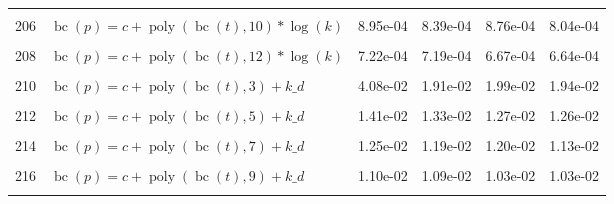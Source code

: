 \documentclass[12pt,a4paper]{article}
\DeclareMathOperator{\bc}{bc}
\DeclareMathOperator{\poly}{poly}
\begin{document}
\begin{longtable}[t]{ll>{\raggedleft\arraybackslash}p{2cm}>{\raggedleft\arraybackslash}p{2cm}>{\raggedleft\arraybackslash}p{2cm}>{\raggedleft\arraybackslash}p{2cm}}
\cellcolor{gray!6}{205} & \cellcolor{gray!6}{$\bc(p) = c + \poly\left( \bc(t), 9 \right) * \log(k)$} & \cellcolor{gray!6}{1.11e-03} & \cellcolor{gray!6}{1.05e-03} & \cellcolor{gray!6}{1.11e-03} & \cellcolor{gray!6}{1.04e-03}\\
206 & $\bc(p) = c + \poly\left( \bc(t), 10 \right) * \log(k)$ & 8.95e-04 & 8.39e-04 & 8.76e-04 & 8.04e-04\\
\cellcolor{gray!6}{207} & \cellcolor{gray!6}{$\bc(p) = c + \poly\left( \bc(t), 11 \right) * \log(k)$} & \cellcolor{gray!6}{7.74e-04} & \cellcolor{gray!6}{7.62e-04} & \cellcolor{gray!6}{7.18e-04} & \cellcolor{gray!6}{7.01e-04}\\
208 & $\bc(p) = c + \poly\left( \bc(t), 12 \right) * \log(k)$ & 7.22e-04 & 7.19e-04 & 6.67e-04 & 6.64e-04\\
\cellcolor{gray!6}{209} & \cellcolor{gray!6}{$\bc(p) = c + \poly\left( \bc(t), 13 \right) * \log(k)$} & \cellcolor{gray!6}{7.12e-04} & \cellcolor{gray!6}{7.11e-04} & \cellcolor{gray!6}{6.54e-04} & \cellcolor{gray!6}{6.53e-04}\\
210 & $\bc(p) = c + \poly\left( \bc(t), 3 \right) + k\_d$ & 4.08e-02 & 1.91e-02 & 1.99e-02 & 1.94e-02\\
\cellcolor{gray!6}{211} & \cellcolor{gray!6}{$\bc(p) = c + \poly\left( \bc(t), 4 \right) + k\_d$} & \cellcolor{gray!6}{2.39e-02} & \cellcolor{gray!6}{2.21e-02} & \cellcolor{gray!6}{2.36e-02} & \cellcolor{gray!6}{2.31e-02}\\
212 & $\bc(p) = c + \poly\left( \bc(t), 5 \right) + k\_d$ & 1.41e-02 & 1.33e-02 & 1.27e-02 & 1.26e-02\\
\cellcolor{gray!6}{213} & \cellcolor{gray!6}{$\bc(p) = c + \poly\left( \bc(t), 6 \right) + k\_d$} & \cellcolor{gray!6}{1.24e-02} & \cellcolor{gray!6}{1.19e-02} & \cellcolor{gray!6}{1.19e-02} & \cellcolor{gray!6}{1.13e-02}\\
214 & $\bc(p) = c + \poly\left( \bc(t), 7 \right) + k\_d$ & 1.25e-02 & 1.19e-02 & 1.20e-02 & 1.13e-02\\
\cellcolor{gray!6}{215} & \cellcolor{gray!6}{$\bc(p) = c + \poly\left( \bc(t), 8 \right) + k\_d$} & \cellcolor{gray!6}{1.10e-02} & \cellcolor{gray!6}{1.10e-02} & \cellcolor{gray!6}{1.04e-02} & \cellcolor{gray!6}{1.03e-02}\\
216 & $\bc(p) = c + \poly\left( \bc(t), 9 \right) + k\_d$ & 1.10e-02 & 1.09e-02 & 1.03e-02 & 1.03e-02\\
\cellcolor{gray!6}{217} & \cellcolor{gray!6}{$\bc(p) = c + \poly\left( \bc(t), 10 \right) + k\_d$} & \cellcolor{gray!6}{1.09e-02} & \cellcolor{gray!6}{1.09e-02} & \cellcolor{gray!6}{1.02e-02} & \cellcolor{gray!6}{1.02e-02}\\

\end{longtable}
\end{document}
